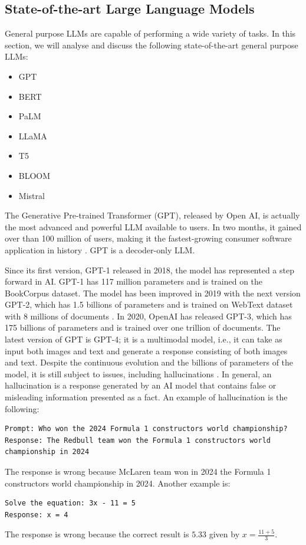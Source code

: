 \subsection{State-of-the-art Large Language Models}
General purpose LLMs are capable of performing a wide variety of tasks.
In this section, we will analyse and discuss the following state-of-the-art general purpose LLMs:
\begin{itemize}
    \item GPT
    \item BERT
    \item PaLM
    \item LLaMA
    \item T5
    \item BLOOM
    \item Mistral
\end{itemize}

The Generative Pre-trained Transformer (GPT), released by Open AI, is actually the most advanced and powerful LLM available to users.
In two months, it gained over than 100 million of users, making it the fastest-growing consumer software application in history \cite{achiam2023gpt}.
GPT is a decoder-only LLM.

Since its first version, GPT-1 released in 2018, the model has represented a step forward in AI.
GPT-1 has 117 million parameters and is trained on the BookCorpus dataset.
The model has been improved in 2019 with the next version GPT-2, which has 1.5 billions of parameters and is trained on WebText dataset with 8 millions of documents \cite{radford2019language}.
In 2020, OpenAI has released GPT-3, which has 175 billions of parameters and is trained over one trillion of documents.
The latest version of GPT is GPT-4; it is a multimodal model, i.e., it can take as input both images and text and generate a response consisting of both images and text.
Despite the continuous evolution and the billions of parameters of the model, it is still subject to issues, including hallucinations \cite{achiam2023gpt}.
In general, an hallucination is a response generated by an AI model that contains false or misleading information presented as a fact. An example of hallucination is the following:
\begin{lstlisting}
Prompt: Who won the 2024 Formula 1 constructors world championship?
Response: The Redbull team won the Formula 1 constructors world championship in 2024
\end{lstlisting}
The response is wrong because McLaren team won in 2024 the Formula 1 constructors world championship in 2024.
Another example is:
\begin{lstlisting}
Solve the equation: 3x - 11 = 5
Response: x = 4
\end{lstlisting}
The response is wrong because the correct result is $5.33$ given by $x = \frac{11+5}{3}$.

